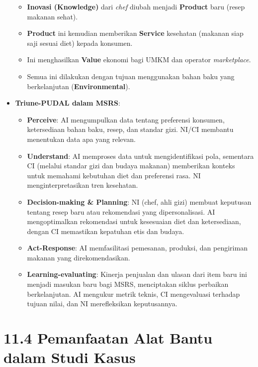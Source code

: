 \documentclass[
  letterpaper,
  DIV=11,
  numbers=noendperiod]{scrreprt}
\providecommand{\tightlist}{%
  \setlength{\itemsep}{0pt}\setlength{\parskip}{0pt}}
\begin{document}
\begin{itemize}
  \begin{itemize}
  \tightlist
  \item
    \textbf{Inovasi (Knowledge)} dari \emph{chef} diubah menjadi
    \textbf{Product} baru (resep makanan sehat).
  \item
    \textbf{Product} ini kemudian memberikan \textbf{Service} kesehatan
    (makanan siap saji sesuai diet) kepada konsumen.
  \item
    Ini menghasilkan \textbf{Value} ekonomi bagi UMKM dan operator
    \emph{marketplace}.
  \item
    Semua ini dilakukan dengan tujuan menggunakan bahan baku yang
    berkelanjutan (\textbf{Environmental}).
  \end{itemize}
\item
  \textbf{Triune-PUDAL dalam MSRS}:

  \begin{itemize}
  \tightlist
  \item
    \textbf{Perceive}: AI mengumpulkan data tentang preferensi konsumen,
    ketersediaan bahan baku, resep, dan standar gizi. NI/CI membantu
    menentukan data apa yang relevan.
  \item
    \textbf{Understand}: AI memproses data untuk mengidentifikasi pola,
    sementara CI (melalui standar gizi dan budaya makanan) memberikan
    konteks untuk memahami kebutuhan diet dan preferensi rasa. NI
    menginterpretasikan tren kesehatan.
  \item
    \textbf{Decision-making \& Planning}: NI (chef, ahli gizi) membuat
    keputusan tentang resep baru atau rekomendasi yang dipersonalisasi.
    AI mengoptimalkan rekomendasi untuk kesesuaian diet dan
    ketersediaan, dengan CI memastikan kepatuhan etis dan budaya.
  \item
    \textbf{Act-Response}: AI memfasilitasi pemesanan, produksi, dan
    pengiriman makanan yang direkomendasikan.
  \item
    \textbf{Learning-evaluating}: Kinerja penjualan dan ulasan dari item
    baru ini menjadi masukan baru bagi MSRS, menciptakan siklus
    perbaikan berkelanjutan. AI mengukur metrik teknis, CI mengevaluasi
    terhadap tujuan nilai, dan NI merefleksikan keputusannya.
  \end{itemize}
\end{itemize}

\section{\texorpdfstring{\textbf{11.4 Pemanfaatan Alat Bantu dalam Studi
Kasus}}{11.4 Pemanfaatan Alat Bantu dalam Studi Kasus}}\label{pemanfaatan-alat-bantu-dalam-studi-kasus}
\end{document}
